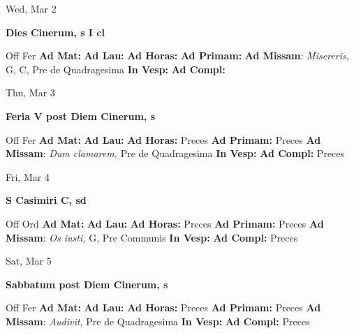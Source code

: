 \documentclass[10pt]{article}
\begin{document}
\begin{minipage}{3.5in}
\vspace{2em}\begin{center}
Wed, Mar 2
\end{center}\textbf{ \large Dies Cinerum, \textnormal{\normalsize s I cl}}
\begin{justify}
Off Fer
\textbf{Ad Mat: }
\textbf{Ad Lau: }
\textbf{Ad Horas: }
\textbf{Ad Primam: }
\textbf{Ad Missam}: \textit{Misereris,} G, C, Pre de Quadragesima
\textbf{In Vesp: }
\textbf{Ad Compl: }\end{justify}
\end{minipage}



\begin{minipage}{3.5in}
\vspace{2em}\begin{center}
Thu, Mar 3
\end{center}\textbf{ \large Feria V post Diem Cinerum, \textnormal{\normalsize s}}
\begin{justify}
Off Fer
\textbf{Ad Mat: }
\textbf{Ad Lau: }
\textbf{Ad Horas: }Preces
\textbf{Ad Primam: }Preces
\textbf{Ad Missam}: \textit{Dum clamarem,} Pre de Quadragesima
\textbf{In Vesp: }
\textbf{Ad Compl: }Preces\end{justify}
\end{minipage}



\begin{minipage}{3.5in}
\vspace{2em}\begin{center}
Fri, Mar 4
\end{center}\textbf{ \large S Casimiri C, \textnormal{\normalsize sd}}
\begin{justify}
Off Ord
\textbf{Ad Mat: }
\textbf{Ad Lau: }
\textbf{Ad Horas: }Preces
\textbf{Ad Primam: }Preces
\textbf{Ad Missam}: \textit{Os iusti,} G, Pre Communis
\textbf{In Vesp: }
\textbf{Ad Compl: }Preces\end{justify}
\end{minipage}



\begin{minipage}{3.5in}
\vspace{2em}\begin{center}
Sat, Mar 5
\end{center}\textbf{ \large Sabbatum post Diem Cinerum, \textnormal{\normalsize s}}
\begin{justify}
Off Fer
\textbf{Ad Mat: }
\textbf{Ad Lau: }
\textbf{Ad Horas: }Preces
\textbf{Ad Primam: }Preces
\textbf{Ad Missam}: \textit{Audivit,} Pre de Quadragesima
\textbf{In Vesp: }
\textbf{Ad Compl: }Preces\end{justify}
\end{minipage}
\end{document}
